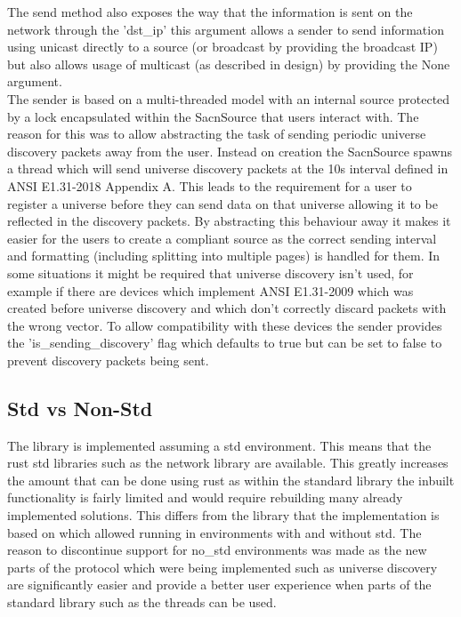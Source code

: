 \documentclass[11pt,a4paper]{article}
\begin{document}
The send method also exposes the way that the information is sent on the network through the 'dst\_ip' this argument allows a sender to send information using unicast directly to a source (or broadcast by providing the broadcast IP) but also allows usage of multicast (as described in design) by providing the None argument. \\

The sender is based on a multi-threaded model with an internal source protected by a lock encapsulated within the SacnSource that users interact with. The reason for this was to allow abstracting the task of sending periodic universe discovery packets away from the user. Instead on creation the SacnSource spawns a thread which will send universe discovery packets at the 10s interval defined in ANSI E1.31-2018 Appendix A. This leads to the requirement for a user to register a universe before they can send data on that universe allowing it to be reflected in the discovery packets. By abstracting this behaviour away it makes it easier for the users to create a compliant source as the correct sending interval and formatting (including splitting into multiple pages) is handled for them. In some situations it might be required that universe discovery isn't used, for example if there are devices which implement ANSI E1.31-2009 which was created before universe discovery and which don't correctly discard packets with the wrong vector. To allow compatibility with these devices the sender provides the 'is\_sending\_discovery' flag which defaults to true but can be set to false to prevent discovery packets being sent.

\subsection{Std vs Non-Std}
The library is implemented assuming a std environment. This means that the rust std libraries such as the network library are available. This greatly increases the amount that can be done using rust as within the standard library the inbuilt functionality is fairly limited and would require rebuilding many already implemented solutions. This differs from the library that the implementation is based on which allowed running in environments with and without std. The reason to discontinue support for no\_std environments was made as the new parts of the protocol which were being implemented such as universe discovery are significantly easier and provide a better user experience when parts of the standard library such as the threads can be used. \\
\end{document}
